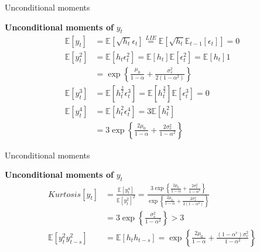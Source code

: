 \documentclass[notes,blackandwhite,mathsans,usenames,dvipsnames]{beamer}
\begin{document}
\begin{frame}{Unconditional moments}

\textbf{Unconditional moments of} $y_t$
\begin{align*}
\mathbb{E}[y_t] &= \mathbb{E}\left[\sqrt{h_t}\epsilon_t\right]\overset{LIE}{=}\mathbb{E}\left[\sqrt{h_t}\mathbb{E}_{t-1}[\epsilon_t]\right] = 0\\[2ex]
\mathbb{E}\left[y_t^2\right] &= \mathbb{E}\left[h_t\epsilon_t^2\right]= \mathbb{E}\left[h_t\right]\mathbb{E}\left[\epsilon_t^2\right]= \mathbb{E}\left[h_t\right]1\\
&= \exp\left\{ \frac{\mu_0 }{1-\alpha} + \frac{\sigma_v^2 }{2\left(1-\alpha^2\right)} \right\} \\[2ex]
\mathbb{E}\left[y_t^3\right] &= \mathbb{E}\left[h_t^{\frac{3}{2}}\epsilon_t^3\right]=  \mathbb{E}\left[h_t^{\frac{3}{2}}\right]\mathbb{E}\left[\epsilon_t^3\right] = 0\\[2ex]
\mathbb{E}\left[y_t^4\right] &= \mathbb{E}\left[h_t^{2}\epsilon_t^4\right]=  3\mathbb{E}\left[h_t^2\right]\\
&= 3\exp\left\{ \frac{2\mu_0 }{1-\alpha}+ \frac{2\sigma_v^2 }{1-\alpha^2}\right\}
\end{align*}

\end{frame}




\begin{frame}{Unconditional moments}

\textbf{Unconditional moments of} $y_t$
\begin{align*}
Kurtosis[y_t]&= \frac{\mathbb{E}\left[y_t^4\right]}{\mathbb{E}\left[y_t^2\right]^2}= \frac{3\exp\left\{ \frac{2\mu_0 }{1-\alpha}+ \frac{2\sigma_v^2 }{1-\alpha^2}\right\}}{\exp\left\{ \frac{2\mu_0 }{1-\alpha} + \frac{2\sigma_v^2 }{2\left(1-\alpha^2\right)} \right\}}\\
&=3\exp\left\{ \frac{\sigma_v^2 }{1-\alpha^2}\right\}>3\\[2ex]
\mathbb{E}\left[ y_t^2y_{t-s}^2 \right] &= \mathbb{E}\left[ h_t h_{t-s} \right]= \exp\left\{ \frac{2\mu_0 }{1-\alpha} + \frac{(1-\alpha^s)\sigma_v^2 }{1-\alpha^2} \right\}
\end{align*}\footnotesize

\end{frame}
\end{document}
